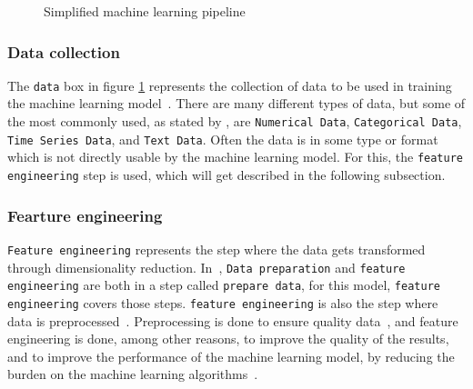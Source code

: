 \begin{figure}[htb!]
    \centering
    \caption{Simplified machine learning pipeline}
    \label{fig:machine-learning-pipeline}
\end{figure}

\subsubsection{Data collection}\label{subsubsec:machine-learning-pipeline-data-collection}
The \texttt{data} box in figure \ref{fig:machine-learning-pipeline} represents the collection of data to be used in training the machine learning model~\cite{machine-learning-pipeline-architecture}. There are many different types of data, but some of the most commonly used, as stated by \cite{the-importance-of-machine-learning-data}, are \texttt{Numerical Data}, \texttt{Categorical Data}, \texttt{Time Series Data}, and \texttt{Text Data}. Often the data is in some type or format which is not directly usable by the machine learning model. For this, the \texttt{feature engineering} step is used, which will get described in the following subsection. 

\subsubsection{Fearture engineering}\label{subsubsec:machine-learning-pipeline-feature-engineering}
\texttt{Feature engineering} represents the step where the data gets transformed through dimensionality reduction. In~\cite{machine-learning-pipeline-architecture}, \texttt{Data preparation} and \texttt{feature engineering} are both in a step called \texttt{prepare data}, for this model, \texttt{feature engineering} covers those steps. \texttt{feature engineering} is also the step where data is preprocessed~\cite{machine-learning-pipeline-architecture}. Preprocessing is done to ensure quality data~\cite{data-preparation-for-data-mining}, and feature engineering is done, among other reasons, to improve the quality of the results, and to improve the performance of the machine learning model, by reducing the burden on the machine learning algorithms~\cite{dimensionality-reduction-reddy}.

